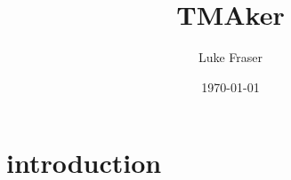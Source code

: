 \documentclass[a4paper,10pt,oneside]{article}
\author{Luke Fraser}
\title{TMAker}
\date{\today}
\begin{document}
\begin{abstract}
  
\end{abstract}

\section{introduction}
\end{document}
